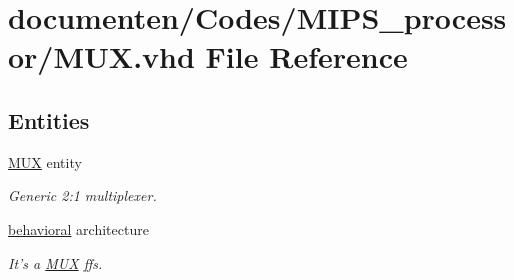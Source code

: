 \hypertarget{_m_u_x_8vhd}{\section{documenten/\-Codes/\-M\-I\-P\-S\-\_\-processor/\-M\-U\-X.vhd File Reference}
\label{_m_u_x_8vhd}
}
\subsection*{Entities}
\begin{DoxyCompactItemize}
\item 
\hyperlink{class_m_u_x}{M\-U\-X} entity
\begin{DoxyCompactList}\small\item\em Generic 2\-:1 multiplexer. \end{DoxyCompactList}\item 
\hyperlink{class_m_u_x_1_1behavioral}{behavioral} architecture
\begin{DoxyCompactList}\small\item\em It's a \hyperlink{class_m_u_x}{M\-U\-X} ffs. \end{DoxyCompactList}\end{DoxyCompactItemize}
